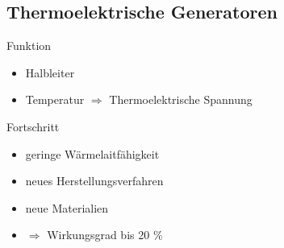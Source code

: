 \subsection{Thermoelektrische Generatoren}
\begin{frame}
\begin{block}{Funktion}
  \begin{itemize}
    \item Halbleiter
    \item Temperatur $\Rightarrow$ Thermoelektrische Spannung
  \end{itemize}
\end{block}
\begin{block}{Fortschritt}
  \begin{itemize}
    \item geringe Wärmelaitfähigkeit
    \item neues Herstellungsverfahren
    \item neue Materialien
  \end{itemize}
  \begin{itemize}
    \item $\Rightarrow$ Wirkungsgrad bis 20 \%
  \end{itemize}
\end{block}
\end{frame}